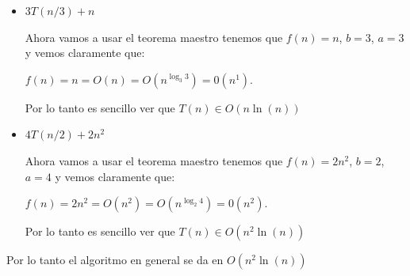 \documentclass[12pt, fleqn]{article}                            %
\theoremstyle{break}                                            %
\begin{document}
        \begin{itemize}
            
            \item 
                $3T(n / 3) + n$
                
                Ahora vamos a usar el teorema maestro tenemos que $f(n) = n$, $b = 3$, $a = 3$
                y vemos claramente que: 

                $f(n) = n = O(n) = O(n^{\log_3 3}) = 0(n^1)$.

                Por lo tanto es sencillo ver que $T(n) \in O(n \ln(n))$ 

            \item 
                $4T(n / 2) + 2n^2$
                
                Ahora vamos a usar el teorema maestro tenemos que $f(n) = 2n^2$, $b = 2$, $a = 4$
                y vemos claramente que: 

                $f(n) = 2n^2 = O(n^2) = O(n^{\log_2 4}) = 0(n^2)$.

                Por lo tanto es sencillo ver que $T(n) \in O(n^2 \ln(n))$ 

        \end{itemize}

        Por lo tanto el algoritmo en general se da en $O(n^2 \ln(n))$
\end{document}
